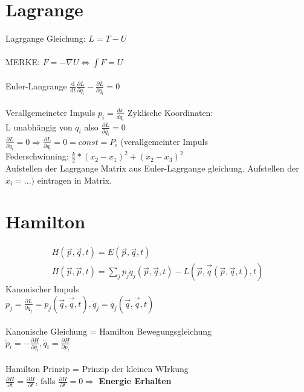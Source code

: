\documentclass[10pt,a4paper]{article}
\begin{document}
\section{Lagrange}
Lagrgange Gleichung: $L = T - U$\\
%
\\
MERKE: $F = -\nabla U \Leftrightarrow \int F = U$\\
%
\\
Euler-Langrange $\frac{\text{d}}{\text{d}t} \frac{\partial L}{\partial \dot{q}_i} - \frac{\partial{L}}{\partial q_i} = 0$\\
%
\\
Verallgemeineter Impuls
$p_i = \frac{d x}{d q_i}$
%
Zyklische Koordinaten:\\
L unabhängig von $q_i$ also $ \frac{\partial L}{\partial q_i}=0$\\
$\frac{\partial{L}}{\partial q_i}=0 \Rightarrow \frac{\partial L}{\partial q_i}=0=const=P_i$ (verallgemeinter Impuls\\
%
Federschwinning: $\frac{k}{2}*(x_2-x_1)^2+(x_2-x_3)^2$\\
%
Aufstellen der Lagrgange Matrix aus Euler-Lagrgange gleichung. Aufstellen der $\dot{x_i}=...)$  eintragen in Matrix.

\section{Hamilton}
\begin{eqnarray}
H(\vec{p},\vec{q},t)= E(\vec{p},\vec{q},t)\\
H(\vec{p},\vec{p},t) = \sum_j  p_j \dot{q}_j  (\vec{p},\vec{q},t)  - L(\vec{p},\vec{\dot{q}}(\vec{p},\vec{q},t),t)
\end{eqnarray}
%
Kanonischer Impuls\\
$p_{j} = {\frac{{\partial L}}{{\partial \dot q_j }}} = p_j(\vec{q},\vec{\dot q}, t), \dot{q}_j= \dot{q_j}(\vec{q},\vec{\dot{q}}, t)$\\
%
\\
Kanonische Gleichung = Hamilton Bewegungsgleichung\\
$\dot{p}_i = -\frac{\partial H}{\partial q_i}, \dot{q}_i = \frac{\partial H}{\partial p_i} $\\
\\
%
Hamilton Prinzip = Prinzip der kleinen WIrkung\\
$\frac{\partial H}{\partial t} = \frac{\partial H}{\partial t}$, falls $\frac{\partial H}{\partial t} = 0 \Rightarrow$ \textbf{Energie Erhalten}
%
\end{document}
